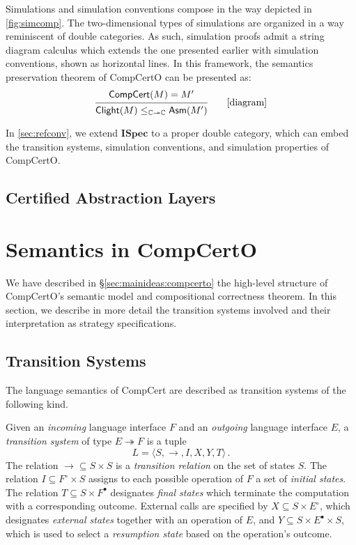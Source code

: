 \documentclass[sigplan,10pt,review,anonymous]{acmart}
\newcommand{\kw}[1]{\ensuremath{ \mathsf{#1} }}
\newcommand{\que}{{\circ}}
\newcommand{\ans}{{\bullet}}
\newcommand{\ISpec}{\mathbf{ISpec}}
\begin{document}
Simulations and simulation conventions
compose in the way depicted in \autoref{fig:simcomp}.
The two-dimensional types of simulations
are organized in a way reminiscent of double categories.
As such,
simulation proofs admit a string diagram calculus \cite{dcsd}
which extends the one presented earlier
with simulation conventions,
shown as horizontal lines.
In this framework,
the semantics preservation theorem of CompCertO
can be presented as:
\[
  \begin{prooftree}
    \hypo{\kw{CompCert}(M) = M'}
    \infer1{
      \kw{Clight}(M)
      \le_{\mathbb{C} \twoheadrightarrow \mathbb{C}}
      \kw{Asm}(M')}
  \end{prooftree}
  \qquad
  \mbox{[diagram]}
\]

In \autoref{sec:refconv},
we extend $\ISpec$ to a proper double category,
which can embed
the transition systems,
simulation conventions, and
simulation properties of CompCertO.


\subsection{Certified Abstraction Layers}


\section{Semantics in CompCertO} \label{sec:compcerto} %

We have described in \S\ref{sec:mainideas:compcerto}
the high-level structure
of CompCertO's semantic model
and compositional correctness theorem.
In this section,
we describe in more detail
the transition systems involved
and their interpretation 
as strategy specifications.

\subsection{Transition Systems}

The language semantics of CompCert are described
as transition systems of the following kind.

\begin{definition}
Given an \emph{incoming} language interface $F$
and an \emph{outgoing} language interface $E$,
a \emph{transition system} of type $E \twoheadrightarrow F$
is a tuple \[ L = \langle S, \rightarrow, I, X, Y, T \rangle \,. \]
The relation
${\rightarrow} \subseteq S \times S$ is
a \emph{transition relation} on the set of states $S$.
The relation
$I \subseteq F^\que \times S$ 
assigns to each possible operation of $F$
a set of \emph{initial states}.
The relation
$T \subseteq S \times F^\ans$
designates \emph{final states}
which terminate the computation with a corresponding outcome.
External calls are specified by
$X \subseteq S \times E^\que$,
which designates \emph{external states} together with
an operation of $E$, and
$Y \subseteq S \times E^\ans \times S$,
which is used to select a \emph{resumption state}
based on the operation's outcome.
\end{definition}
\end{document}
